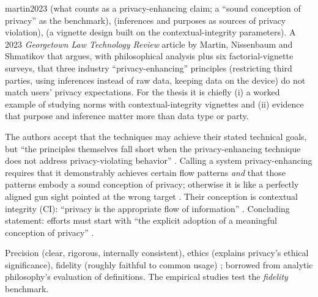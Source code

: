 \begin{papercard}{martin2023}
  (what counts as a privacy-enhancing claim; a ``sound conception of privacy'' as the benchmark),  (inferences and purposes as sources of privacy violation),  (a vignette design built on the contextual-integrity parameters). A 2023 \emph{Georgetown Law Technology Review} article by Martin, Nissenbaum and Shmatikov that argues, with philosophical analysis plus six factorial-vignette surveys, that three industry ``privacy-enhancing'' principles (restricting third parties, using inferences instead of raw data, keeping data on the device) do not match users' privacy expectations. For the thesis it is chiefly (i) a worked example of studying norms with contextual-integrity vignettes and (ii) evidence that purpose and inference matter more than data type or party.

 The authors accept that the techniques may achieve their stated technical goals, but ``the principles themselves fall short when the privacy-enhancing technique does not address privacy-violating behavior'' . Calling a system privacy-enhancing requires that it demonstrably achieves certain flow patterns \emph{and} that those patterns embody a sound conception of privacy; otherwise it is like a perfectly aligned gun sight pointed at the wrong target . Their conception is contextual integrity (CI): ``privacy is the appropriate flow of information'' . Concluding statement: efforts must start with ``the explicit adoption of a meaningful conception of privacy'' .

 Precision (clear, rigorous, internally consistent), ethics (explains privacy's ethical significance), fidelity (roughly faithful to common usage) ; borrowed from analytic philosophy's evaluation of definitions. The empirical studies test the \emph{fidelity} benchmark.


\end{papercard}
